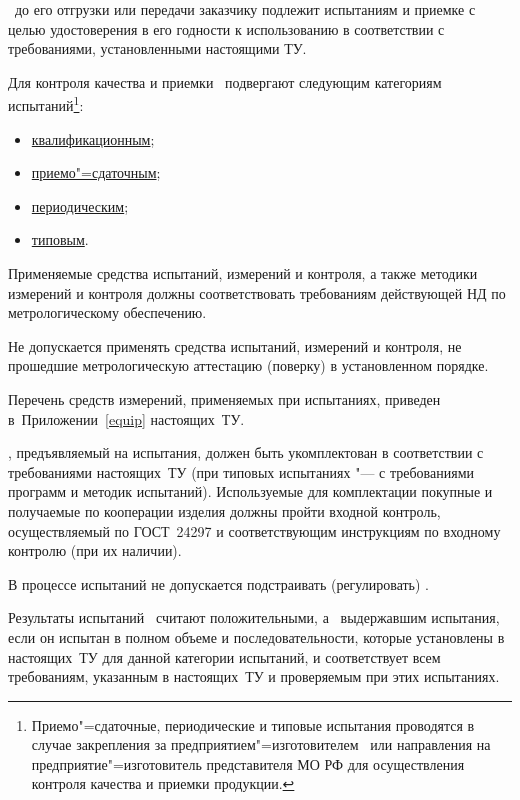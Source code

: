 \point
\dut \ до его отгрузки или передачи заказчику подлежит испытаниям и приемке с целью удостоверения  в его годности к использованию в соответствии с требованиями, установленными настоящими ТУ.

\point  
Для контроля качества и приемки \dut \ подвергают следующим категориям испытаний\footnote{%
Приемо"=сдаточные, периодические и типовые испытания проводятся в случае закрепления за предприятием"=изготовителем \client \ или направления на предприятие"=изготовитель представителя МО РФ для осуществления контроля качества и приемки продукции.}:
%
\begin{itemize}
	\item \hyperref[prav_kv]{квалификационным};
	\item \hyperref[prav_psi]{приемо"=сдаточным};
	\item \hyperref[prav_pi]{периодическим}; 
	\item \hyperref[prav_tip]{типовым}.
\end{itemize}

\point 
Применяемые средства испытаний, измерений и  контроля, а также методики измерений и контроля должны соответствовать требованиям действующей НД по метрологическому обеспечению.

Не допускается применять средства испытаний, измерений и контроля, не прошедшие метрологическую аттестацию (поверку) в установленном порядке.

Перечень средств измерений, применяемых при испытаниях, приведен в~Приложении~\ref{equip} настоящих~ТУ.

\point 
\dut, предъявляемый на испытания, должен быть укомплектован в соответствии с требованиями настоящих~ТУ (при типовых испытаниях "--- с требованиями программ и методик испытаний). Используемые для комплектации покупные и получаемые по кооперации изделия должны пройти входной контроль, осуществляемый по ГОСТ~24297 и соответствующим инструкциям по входному контролю (при их наличии).

\point 
В процессе испытаний не допускается подстраивать (регулировать) \dut.

\point
Результаты испытаний \dut \ считают положительными, а \dut \ выдержавшим испытания, если он испытан в полном объеме и последовательности, которые установлены в настоящих~ТУ для данной категории испытаний, и соответствует всем требованиям, указанным в настоящих~ТУ и проверяемым при этих испытаниях.

